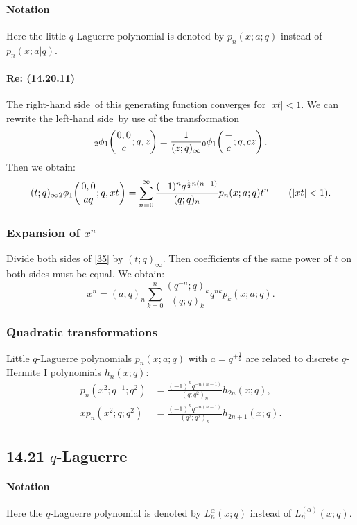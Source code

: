 \documentclass[twoside,11pt]{article}
\newcommand\al\alpha
\newcommand\half{\frac12}
\newcommand\iy\infty
\newcommand{\qhypK}[5]{ \mbox{}_{#1}\phi_{#2}\!\left(
  \genfrac{}{}{0pt}{}{#3}{#4};#5\right)}
\newcommand\LHS{left-hand side}
\newcommand\RHS{right-hand side}
\begin{document}
\paragraph{Notation}
Here the little $q$-Laguerre polynomial is denoted by
$p_n(x;a;q)$ instead of
$p_n(x;a |  q)$.
%
\paragraph{Re: (14.20.11)}
The \RHS\ of this generating function converges for $|xt|<1$.
We can rewrite the \LHS\ by use of the transformation
\begin{equation*}
\qhypK21{0,0}c{q,z}=\frac1{(z;q)_\iy} \qhypK01-c{q,cz}.
\end{equation*}
Then we obtain:
\begin{equation}
(t;q)_\iy \qhypK21{0,0}{aq}{q,xt}
=\sum_{n=0}^\iy\frac{(-1)^n q^{\half n(n-1)}}{(q;q)_n} 
p_n(x;a;q) t^n\qquad(|xt|<1).
\label{35}
\end{equation}
%
\subsubsection*{Expansion of $x^n$}
Divide both sides of \eqref{35} by $(t;q)_\iy$. Then coefficients of the
same power of $t$ on both sides must be equal. We obtain:
\begin{equation}
x^n=(a;q)_n \sum_{k=0}^n \frac{(q^{-n};q)_k}{(q;q)_k} q^{nk} p_k(x;a;q).
\label{36}
\end{equation}
%
\subsubsection*{Quadratic transformations}
Little $q$-Laguerre polynomials $p_n(x;a;q)$ with $a=q^{\pm\half}$ are
related to discrete $q$-Hermite I polynomials $h_n(x;q)$:
\begin{align}
p_n(x^2;q^{-1};q^2)&=
\frac{(-1)^n q^{-n(n-1)}}{(q;q^2)_n} h_{2n}(x;q),
\label{28}\\
xp_n(x^2;q;q^2)&=
\frac{(-1)^n q^{-n(n-1)}}{(q^3;q^2)_n} h_{2n+1}(x;q).
\label{29}
\end{align}
%
\subsection*{14.21 $q$-Laguerre}
\label{sec14.21}
%
\paragraph{Notation}
Here the $q$-Laguerre polynomial is denoted by $L_n^\al(x;q)$ instead of
$L_n^{(\al)}(x;q)$.
%
\end{document}
